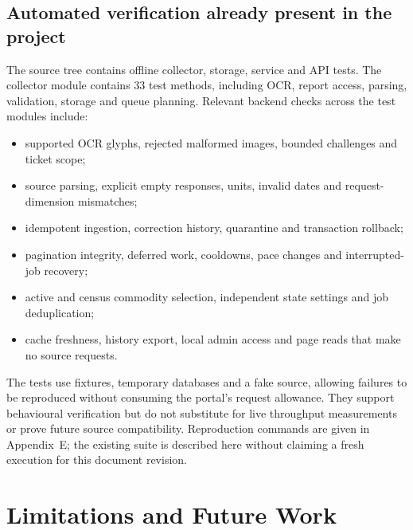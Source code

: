 \documentclass[12pt,a4paper,oneside]{report}
\numberwithin{equation}{chapter}
\numberwithin{figure}{chapter}
\numberwithin{table}{chapter}
\theoremstyle{definition}
\begin{document}
\section{Automated verification already present in the project}
The source tree contains offline collector, storage, service and API tests. The collector module contains 33 test methods, including OCR, report access, parsing, validation, storage and queue planning. Relevant backend checks across the test modules include:
\begin{itemize}
  \item supported OCR glyphs, rejected malformed images, bounded challenges and ticket scope;
  \item source parsing, explicit empty responses, units, invalid dates and request-dimension mismatches;
  \item idempotent ingestion, correction history, quarantine and transaction rollback;
  \item pagination integrity, deferred work, cooldowns, pace changes and interrupted-job recovery;
  \item active and census commodity selection, independent state settings and job deduplication;
  \item cache freshness, history export, local admin access and page reads that make no source requests.
\end{itemize}

The tests use fixtures, temporary databases and a fake source, allowing failures to be reproduced without consuming the portal's request allowance. They support behavioural verification but do not substitute for live throughput measurements or prove future source compatibility. Reproduction commands are given in Appendix~E; the existing suite is described here without claiming a fresh execution for this document revision.

\chapter{Limitations and Future Work}
\end{document}
